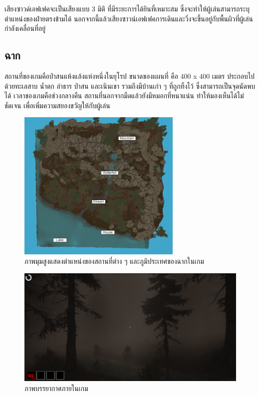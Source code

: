 เสียงซาวด์เอฟเฟคจะเป็นเสียงแบบ 3 มิติ ที่มีระยะการได้ยินที่เหมาะสม ซึ่งจะทำให้ผู้เล่นสามารถระบุตำแหน่งของฝ่ายตรงข้ามได้ 
นอกจากนี้แล้วเสียงซาวน์เอฟเฟคการเดินและวิ่งจะขึ้นอยู่กับพื้นผิวที่ผู้เล่นกำลังเคลื่อนที่อยู่

\subsection{ฉาก}

สถานที่ของเกมคือป่าสนแห้งแล้งแห่งหนึ่งในยุโรป ขนาดของแผนที่ คือ 400 x 400 เมตร ประกอบไปด้วยทะเลสาบ 
น้ำตก ลำธาร ป่าสน และเนินเขา รวมถึงมีบ้านเก่า ๆ ที่ถูกทิ้งไว้ ซึ่งสามารถเป็นจุดนัดพบได้ เวลาของเกมคือช่วงกลางคืน 
สถานที่นอกจากมืดแล้วยังมีหมอกที่หนาแน่น ทำให้มองเห็นได้ไม่ชัดเจน เพื่อเพิ่มความสยองขวัญให้กับผู้เล่น

\begin{figure}[p]
  \begin{center}
  \includegraphics[width=0.7\textwidth]{./img/scene/WitchHunter-Map.png}
  \end{center}
  \caption[ภาพมุมสูงแสดงตำแหน่งของสถานที่ต่าง ๆ
  และภูมิประเทศของฉากในเกม]{ภาพมุมสูงแสดงตำแหน่งของสถานที่ต่าง ๆ
  และภูมิประเทศของฉากในเกม}
  \label{ภาพมุมสูงแสดงตำแหน่งของสถานที่ต่าง ๆ
  และภูมิประเทศของฉากในเกม}
\end{figure}

\begin{figure}[p]
  \begin{center}
  \includegraphics[width=\textwidth]{./img/scene/atmosphere.png}
  \end{center}
  \caption[ภาพบรรยากาศภายในเกม]{ภาพบรรยากาศภายในเกม}
  \label{ภาพบรรยากาศภายในเกม}
\end{figure}

